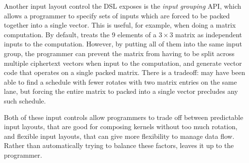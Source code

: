Another input layout control the \system DSL exposes is the {\em input grouping} API, which allows a programmer to specify sets of inputs which are forced to be packed together into a single vector.
This is useful, for example, when doing a matrix computation.
By default, \system treats the 9 elements of a $3 \times 3$ matrix as independent inputs to the computation.
However, by putting all of them into the same input group, the programmer can prevent the matrix from having to be split across multiple ciphertext vectors when input to the computation, and generate vector code that operates on a single packed matrix. 
There is a tradeoff: \system may have been able to find a schedule with fewer rotates with two matrix entries on the same lane, but forcing the entire matrix to packed into a single vector precludes any such schedule.

Both of these input controls allow programmers to trade off between predictable input layouts, that are good for composing kernels without too much rotation, and flexible input layouts, that can give \system more flexibility to manage data flow. Rather than automatically trying to balance these factors, \system leaves it up to the programmer.





